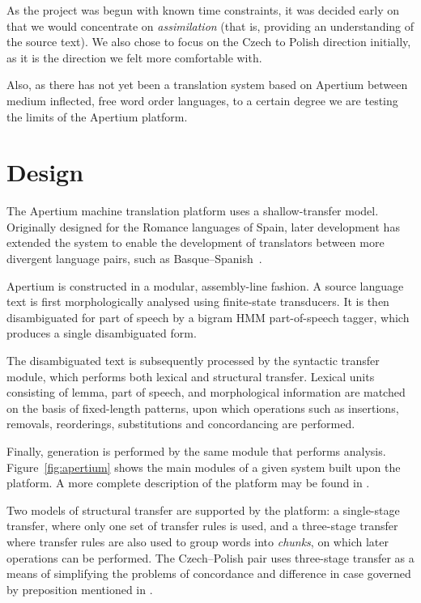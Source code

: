 \documentclass[11pt]{article}
\begin{document}
As the project was begun with known time constraints, it was decided early on that we would 
concentrate on \emph{assimilation} (that is, providing an understanding of the source text). 
We also chose to focus on the Czech to Polish direction initially, as it is the direction 
we felt more comfortable with. 

Also, as there has not yet been a translation system based on Apertium between
medium inflected, free word order languages, to a certain degree we are testing
the limits of the Apertium platform.

\section{Design}
The Apertium machine translation platform uses a shallow-transfer model.
Originally designed for the Romance languages of Spain, later development has
extended the system to enable the development of translators between more
divergent language pairs, such as Basque--Spanish~\citep{ginestirosell09}.

Apertium is constructed in a modular, assembly-line fashion. 
A source language text is first morphologically analysed using finite-state 
transducers. It is then disambiguated for part of speech by a bigram HMM 
part-of-speech tagger, which produces a single disambiguated form.

The disambiguated text is subsequently processed by the syntactic transfer
module, which performs both lexical and structural transfer. Lexical units
consisting of lemma, part of speech, and morphological information are 
matched on the basis of fixed-length patterns, upon which operations such
as insertions, removals, reorderings, substitutions and concordancing are
performed.

Finally, generation
is performed by the same module that performs analysis. Figure~\ref{fig:apertium}
shows the main modules of a given system built upon the platform. A more complete description
of the platform may be found in \citet{armentano06p}.

Two models of structural transfer are supported by the platform: a single-stage transfer, where only
one set of transfer rules is used, and a three-stage transfer where transfer rules are also used to 
group words into \emph{chunks}, on which later operations can be performed. The Czech--Polish
pair uses three-stage transfer as a means of simplifying the problems of concordance
and difference in case governed by preposition mentioned in \cite{Debowski02}.
\end{document}
